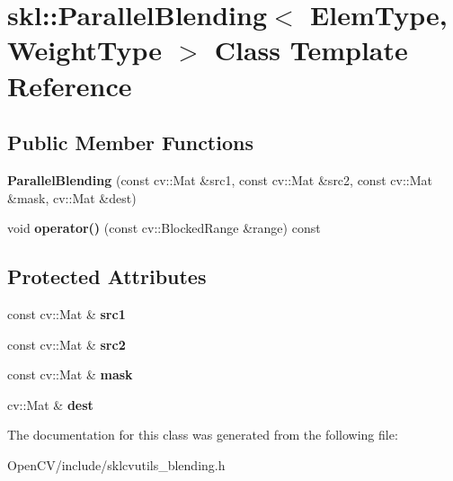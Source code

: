 \hypertarget{classskl_1_1_parallel_blending}{}\section{skl\+:\+:Parallel\+Blending$<$ Elem\+Type, Weight\+Type $>$ Class Template Reference}
\label{classskl_1_1_parallel_blending}
\subsection*{Public Member Functions}
\begin{DoxyCompactItemize}
\item 
\hypertarget{classskl_1_1_parallel_blending_acd87d25766dd761d368081adedddc3d8}{}\label{classskl_1_1_parallel_blending_acd87d25766dd761d368081adedddc3d8} 
{\bfseries Parallel\+Blending} (const cv\+::\+Mat \&src1, const cv\+::\+Mat \&src2, const cv\+::\+Mat \&mask, cv\+::\+Mat \&dest)
\item 
\hypertarget{classskl_1_1_parallel_blending_ad7109be1d417ef6b2348eeca533b00da}{}\label{classskl_1_1_parallel_blending_ad7109be1d417ef6b2348eeca533b00da} 
void {\bfseries operator()} (const cv\+::\+Blocked\+Range \&range) const
\end{DoxyCompactItemize}
\subsection*{Protected Attributes}
\begin{DoxyCompactItemize}
\item 
\hypertarget{classskl_1_1_parallel_blending_a29343b128d6fed39999113b68824b3c1}{}\label{classskl_1_1_parallel_blending_a29343b128d6fed39999113b68824b3c1} 
const cv\+::\+Mat \& {\bfseries src1}
\item 
\hypertarget{classskl_1_1_parallel_blending_ace5344e54ab8ae5c2fe519f8623bcbd6}{}\label{classskl_1_1_parallel_blending_ace5344e54ab8ae5c2fe519f8623bcbd6} 
const cv\+::\+Mat \& {\bfseries src2}
\item 
\hypertarget{classskl_1_1_parallel_blending_a356e7f2592a00abc49b64b20cca84eb9}{}\label{classskl_1_1_parallel_blending_a356e7f2592a00abc49b64b20cca84eb9} 
const cv\+::\+Mat \& {\bfseries mask}
\item 
\hypertarget{classskl_1_1_parallel_blending_a58e7a8004c3e7565f5eca3ca63bb07b7}{}\label{classskl_1_1_parallel_blending_a58e7a8004c3e7565f5eca3ca63bb07b7} 
cv\+::\+Mat \& {\bfseries dest}
\end{DoxyCompactItemize}


The documentation for this class was generated from the following file\+:\begin{DoxyCompactItemize}
\item 
Open\+C\+V/include/sklcvutils\+\_\+blending.\+h\end{DoxyCompactItemize}
